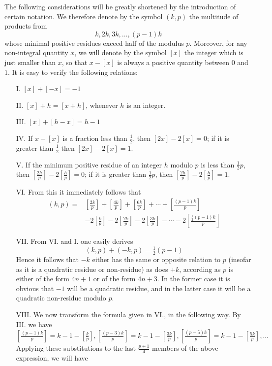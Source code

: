 \documentclass[14pt]{memoir}
\theoremstyle{plain}
\theoremstyle{remark}
\begin{document}
The following considerations will be greatly shortened by the introduction of certain notation.  We therefore denote by the symbol $(k,p)$ the multitude of products from
\[ k, 2k, 3k, \dots, (p-1)k \]
whose minimal positive residues exceed half of the modulus $p$.    Moreover, for any non-integral quantity $x$, we will denote by the symbol $[x]$ the integer which is just smaller than $x$, so that $x - [x]$ is always a positive quantity between $0$ and $1$.  It is easy to verify the following relations:
\begin{enumerate}
\item[I.] $[x] + [-x] = -1$ 
\item[II.] $[x] + h = [x+h]$, whenever $h$ is an integer.
\item[III.] $[x] + [h-x] = h-1$
\item[IV.] If $x-[x]$ is a fraction less than $\tfrac{1}{2}$, then $[2x]-2[x]=0$; if it is greater than $\tfrac{1}{2}$ then $[2x]-2[x]=1$.
\item[V.] If the minimum positive residue of an integer $h$ modulo $p$ is less than $\tfrac{1}{2}p$, then $\left[\tfrac{2h}{p}\right]-2\left[\tfrac{h}{p}\right] = 0$;  if it is greater than $\tfrac{1}{2} p$, then $\left[\tfrac{2h}{p}\right]-2\left[\tfrac{h}{p}\right] = 1$.
\item[VI.] From this it immediately follows that
\begin{align*} (k,p) = & \left[ \tfrac{2k}{p} \right] + \left[ \tfrac{4k}{p} \right] + \left[ \tfrac{6k}{p} \right] + \cdots + \left[ \tfrac{(p-1)k}{p} \right] \\
&- 2 \left[ \tfrac{k}{p} \right] - 2 \left[ \tfrac{2k}{p} \right] -2  \left[ \tfrac{3k}{p} \right]-  \cdots -  2 \left[ \tfrac{\frac{1}{2} (p-1)k}{p} \right] \end{align*}
\item[VII.] From VI. and I. one easily derives
\[ (k,p) + (-k,p) = \tfrac{1}{2} (p-1) \]
Hence it follows that  $-k$ either has the same or opposite relation to $p$ (insofar as it is a quadratic residue or non-residue) as does $+k$, according as $p$ is either of the form $ 4n+1$ or of the form $4n+3$.  In the former case it is obvious that $-1$ will be a quadratic residue, and in the latter case it will be a quadratic non-residue modulo $p$. 
\item[VIII.] We now transform the formula given in VI., in the following way.   By III. we have
\[ \left[ \tfrac{(p-1)k}{p}\right] = k-1-\left[\tfrac{k}{p}\right] , \left[ \tfrac{(p-3)k}{p}\right] = k-1-\left[\tfrac{3k}{p}\right] , \left[ \tfrac{(p-5)k}{p}\right] = k-1-\left[\tfrac{5k}{p}\right] , \dots \]
 Applying these substitutions to the last $\tfrac{p \mp 1}{4}$ members of the above expression, we will have
 

\end{enumerate}
\end{document}
